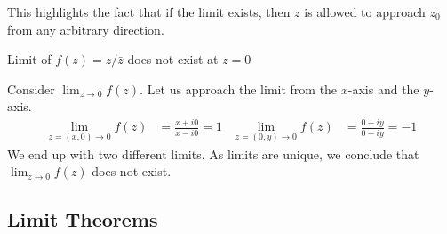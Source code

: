 \documentclass[12pt, english]{book}
\begin{document}
	This highlights the fact that if the limit exists, then $z$ is allowed to approach $z_0$ from any arbitrary direction. 
	
	\begin{example}
		Limit of $f(z) = z /\bar{z}$ does not exist at $z = 0$
		
		Consider $\lim_{z \rightarrow 0} f(z)$. Let us approach the limit from the $x$-axis and the $y$-axis. 
		\begin{align*}
			\lim_{z = (x, 0) \rightarrow 0} f(z) &= \frac{x + i0}{x - i0} = 1
			& \lim_{z = (0, y) \rightarrow 0} f(z) &= \frac{0 + iy}{0 - iy} = -1
		\end{align*} 
		We end up with two different limits. As limits are unique, we conclude that $\lim_{z\rightarrow0} f(z)$ does not exist. 
	\end{example}

	\subsection{Limit Theorems} \label{Limit Theorems Subsection - Complex}
	
\end{document}
